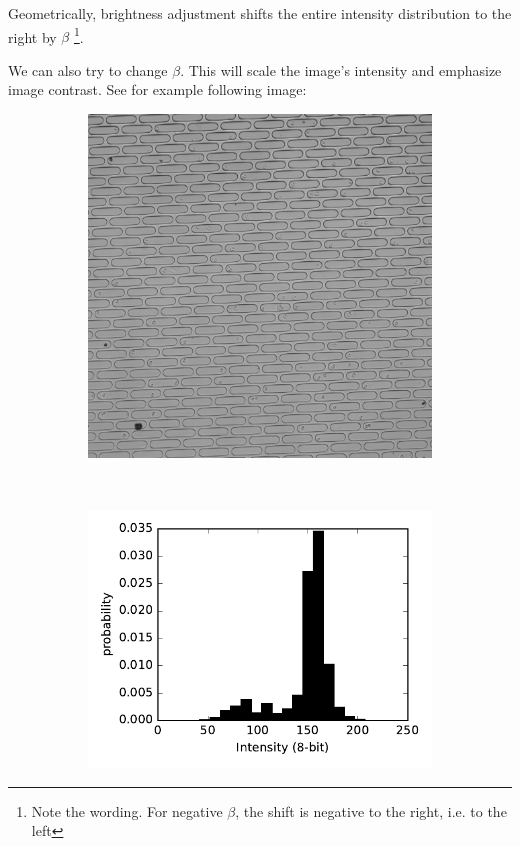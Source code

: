 \documentclass[pdftex,12pt,a4paper]{report}
\begin{document}
Geometrically, brightness adjustment shifts the entire intensity distribution to the right by $\beta$ \footnote{Note the wording. For negative $\beta$, the shift is negative to the right, i.e. to the left}.

We can also try to change $\beta$. This will scale the image's intensity and emphasize image contrast. See for example following image:

\begin{figure}[H]
\centering

\begin{subfigure}{0.4\textwidth}
  \centering
  \includegraphics[width=\textwidth]{images/pos_41_in_t0_br_times3}
  \caption{}
  \label{fig:pos41_times3_bf}
\end{subfigure}%
~
\begin{subfigure}{0.6\textwidth}
  \centering
  \includegraphics[width=\textwidth]{images/pos_41_in_t0_br_times3_hist}
  \caption{}
  \label{fig:pos41_times3_hist}
\end{subfigure}%


\end{figure}
\end{document}
